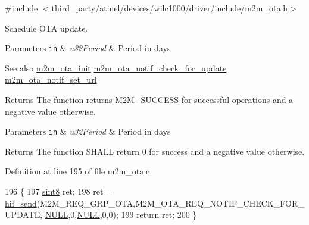 {\ttfamily \#include $<$\hyperlink{m2m__ota_8h}{third\+\_\+party/atmel/devices/wilc1000/driver/include/m2m\+\_\+ota.\+h}$>$}



Schedule O\+TA update. 


\begin{DoxyParams}[1]{Parameters}
\mbox{\tt in}  & {\em u32\+Period} & Period in days\\
\hline
\end{DoxyParams}
\begin{DoxySeeAlso}{See also}
\hyperlink{group__OtaInitFn_gacd2a1a8ffaccc3deb1970cf1ad41ceec}{m2m\+\_\+ota\+\_\+init} \hyperlink{group__OtaNotifCheckFn_ga522222363c6991cb078c38b06cfa6c80}{m2m\+\_\+ota\+\_\+notif\+\_\+check\+\_\+for\+\_\+update} \hyperlink{group__OtaNotifStFn_ga98ab9f03996e6bf1cb21ba7259bb0058}{m2m\+\_\+ota\+\_\+notif\+\_\+set\+\_\+url} 
\end{DoxySeeAlso}
\begin{DoxyReturn}{Returns}
The function returns \hyperlink{nm__common_8h_a9ef27ba27aafdd1aa3a79d3ba2c36b8f}{M2\+M\+\_\+\+S\+U\+C\+C\+E\+SS} for successful operations and a negative value otherwise.
\end{DoxyReturn}

\begin{DoxyParams}[1]{Parameters}
\mbox{\tt in}  & {\em u32\+Period} & Period in days\\
\hline
\end{DoxyParams}
\begin{DoxyReturn}{Returns}
The function S\+H\+A\+LL return 0 for success and a negative value otherwise. 
\end{DoxyReturn}


Definition at line 195 of file m2m\+\_\+ota.\+c.


\begin{DoxyCode}
196 \{
197     \hyperlink{group__DataT_gae35f10ffd0ac8dd2bc3e794da9bdfbc7}{sint8} ret;
198     ret = \hyperlink{m2m__hif_8c_a13ba8ad11b2ac39516ca787386d16ce0}{hif\_send}(M2M\_REQ\_GRP\_OTA,M2M\_OTA\_REQ\_NOTIF\_CHECK\_FOR\_UPDATE,
      \hyperlink{group__BSPDefine_ga070d2ce7b6bb7e5c05602aa8c308d0c4}{NULL},0,\hyperlink{group__BSPDefine_ga070d2ce7b6bb7e5c05602aa8c308d0c4}{NULL},0,0);
199     \textcolor{keywordflow}{return} ret;
200 \}
\end{DoxyCode}
